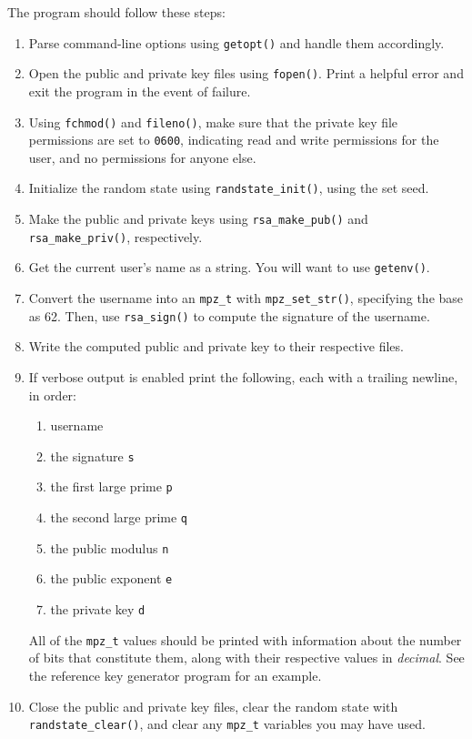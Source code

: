 The program should follow these steps:
\begin{enumerate}
  \item Parse command-line options using \texttt{getopt()} and handle
    them accordingly.
  \item Open the public and private key files using \texttt{fopen()}.
    Print a helpful error and exit the program in the event of failure.
  \item Using \texttt{fchmod()} and \texttt{fileno()}, make sure that
    the private key file permissions are set to \texttt{0600},
    indicating read and write permissions for the user, and no
    permissions for anyone else.
  \item Initialize the random state using \texttt{randstate\_init()},
    using the set seed.
  \item Make the public and private keys using \texttt{rsa\_make\_pub()}
    and \texttt{rsa\_make\_priv()}, respectively.
  \item Get the current user's name as a string. You will want to use
    \texttt{getenv()}.
  \item Convert the username into an \texttt{mpz\_t} with
    \texttt{mpz\_set\_str()}, specifying the base as 62. Then, use
    \texttt{rsa\_sign()} to compute the signature of the username.
  \item Write the computed public and private key to their respective
    files.
  \item If verbose output is enabled print the following, each with a
    trailing newline, in order:
    \begin{enumerate}
      \item username
      \item the signature \texttt{s}
      \item the first large prime \texttt{p}
      \item the second large prime \texttt{q}
      \item the public modulus \texttt{n}
      \item the public exponent \texttt{e}
      \item the private key \texttt{d}
    \end{enumerate}
    All of the \texttt{mpz\_t} values should be printed with information
    about the number of bits that constitute them, along with their
    respective values in \emph{decimal}. See the reference key generator
    program for an example.
  \item Close the public and private key files, clear the random state
    with \texttt{randstate\_clear()}, and clear any \texttt{mpz\_t}
    variables you may have used.
\end{enumerate}
